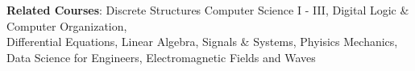 
\begin{itemize}[leftmargin=0.15in, label={}]
    \small{\item{
        \textbf{Related Courses}{: 
            Discrete Structures Computer Science I - III, 
            Digital Logic \& Computer Organization, 
            \\ \hspace{2.75cm}
            Differential Equations, 
            Linear Algebra,
            Signals \& Systems, 
            Phyisics Mechanics,
            \\ \hspace{2.75cm}
            Data Science for Engineers,
            Electromagnetic Fields and Waves
        } \\
    }}
\end{itemize}